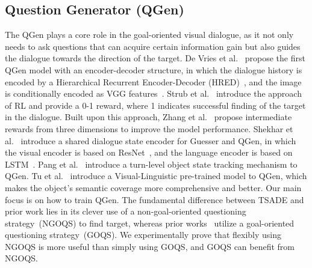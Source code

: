 \subsection{Question Generator (QGen)}
The QGen plays a core role in the goal-oriented visual dialogue, as it not only needs to ask questions that can acquire certain information gain but also guides the dialogue towards the direction of the target.  
De Vries et al.~ propose the first QGen model with an encoder-decoder structure, in which the dialogue history is encoded by a Hierarchical Recurrent Encoder-Decoder (HRED)~\cite{serban2015hierarchical}, and the image is conditionally encoded as VGG features~\cite{simonyan2014very}.
Strub et al.~ introduce the approach of RL and provide a 0-1 reward, where 1 indicates successful finding of the target in the dialogue. Built upon this approach, Zhang et al.~ propose intermediate rewards from three dimensions to improve the model performance. 
Shekhar et al.~ introduce a shared dialogue state encoder for Guesser and QGen, in which the visual encoder is based on ResNet~\cite{he2016deep}, and the language encoder is based on LSTM~\cite{hochreiter1997long}. Pang et al.~ introduce a turn-level object state tracking mechanism to QGen. Tu et al.~ introduce a Visual-Linguistic pre-trained model to QGen, which makes the object's semantic coverage more comprehensive and better.
Our main focus is on how to train QGen. 
The fundamental difference between TSADE and prior work lies in its clever use of a non-goal-oriented questioning strategy~(NGOQS) to find target, whereas prior works~\cite{zhang2018goal,shukla2019should,testoni2021looking} utilize a goal-oriented questioning strategy~(GOQS). 
We experimentally prove that flexibly using NGOQS is more useful than simply using GOQS, and GOQS can benefit from NGOQS.






